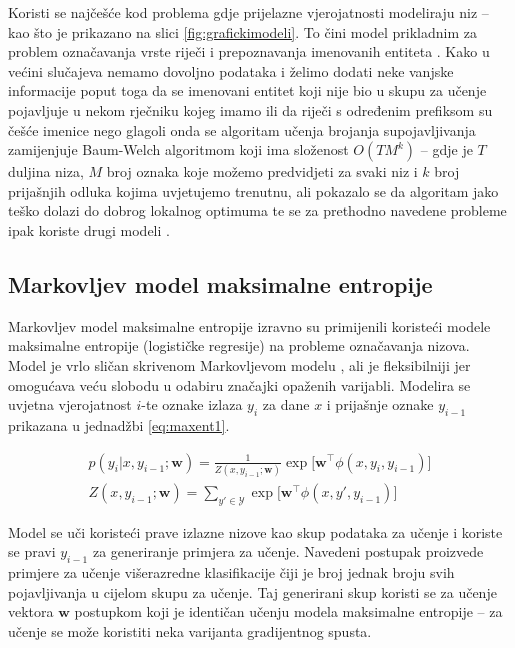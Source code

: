 Koristi se najčešće kod problema gdje prijelazne vjerojatnosti modeliraju niz --
kao što je prikazano na slici \ref{fig:grafickimodeli}. To čini model prikladnim
za problem označavanja vrste riječi \citep{halacsy2007hunpos} i prepoznavanja
imenovanih entiteta \citep{zhou2002named}. Kako u većini slučajeva nemamo
dovoljno podataka i želimo dodati neke vanjske informacije poput toga da se
imenovani entitet koji nije bio u skupu za učenje pojavljuje u nekom rječniku
kojeg imamo ili da riječi s određenim prefiksom su češće imenice nego glagoli
onda se algoritam učenja brojanja supojavljivanja zamijenjuje Baum-Welch
algoritmom koji ima složenost $O(T M ^ k)$ -- gdje je $T$ duljina niza, $M$ broj
oznaka koje možemo predvidjeti za svaki niz i $k$ broj prijašnjih odluka kojima
uvjetujemo trenutnu, ali pokazalo se da algoritam jako teško dolazi do dobrog
lokalnog optimuma te se za prethodno navedene probleme ipak koriste drugi modeli
\citep{johnson2007doesn}.

\subsection{Markovljev model maksimalne entropije}

Markovljev model maksimalne entropije 
izravno su primijenili \citet*{mccallum2000maximum} koristeći modele maksimalne
entropije (logističke regresije) na probleme označavanja nizova. Model je vrlo
sličan skrivenom Markovljevom modelu , ali je
fleksibilniji jer omogućava veću slobodu u odabiru značajki opaženih varijabli.
Modelira se uvjetna vjerojatnost $i$-te oznake izlaza $y_i$ za dane $x$ i
prijašnje oznake $y_{i-1}$ prikazana u jednadžbi \ref{eq:maxent1}.

\begin{equation}\label{eq:maxent1}
\begin{aligned}
  p(y_i | x, y_{i-1}; \mathbf{w}) = \frac{1}{Z(x, y_{i-1}; \mathbf{w})} \exp \big[ \mathbf{w}^\top \phi(x, y_i, y_{i-1})\big] \\
  Z(x, y_{i-1}; \mathbf{w}) = \sum_{y' \in \mathcal{Y}} \exp \big[ \mathbf{w}^\top \phi(x, y', y_{i-1})\big]
\end{aligned}
\end{equation}

Model se uči koristeći prave izlazne nizove kao skup podataka za učenje i
koriste se pravi $y_{i-1}$ za generiranje primjera za učenje. Navedeni postupak
proizvede primjere za učenje višerazredne klasifikacije čiji je broj jednak
broju svih pojavljivanja u cijelom skupu za učenje. Taj generirani skup koristi
se za učenje vektora $\mathbf{w}$ postupkom koji je identičan učenju modela
maksimalne entropije -- za učenje se može koristiti neka varijanta gradijentnog
spusta.

